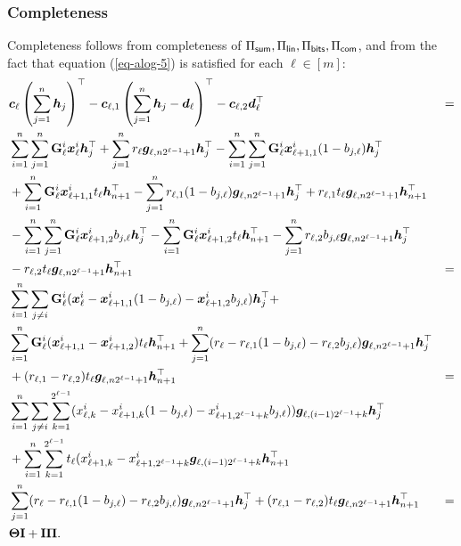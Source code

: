 \subsubsection{Completeness}
Completeness follows from completeness of \(\Pi_{\mathsf{sum}},\Pi_\mathsf{lin},\Pi_{\mathsf{bits}},\Pi_{\mathsf{com}}\), and from the fact that equation (\ref{eq-alog-5}) is satisfied for each \(\ell\in [m]\):
\begin{align*}
&{\boldsymbol{c}}_\ell\left(\sum_{j=1}^n {\boldsymbol{h}}_j\right)^\top-
{\boldsymbol{c}}_{\ell,1}\left(\sum_{j=1}^n{\boldsymbol{h}}_j-{\boldsymbol{d}}_\ell\right)^\top-
{\boldsymbol{c}}_{\ell,2}{\boldsymbol{d}}_\ell^\top &= \\
&\sum_{i=1}^n\sum_{j=1}^n\mathbf{{G}}_{\ell}^{i}{\boldsymbol{x}}^i_{\ell}{\boldsymbol{h}}_j^\top+\sum_{j=1}^nr_\ell{\boldsymbol{g}}_{\ell,n2^{\ell-1}+1}{\boldsymbol{h}}_j^\top
-\sum_{i=1}^n\sum_{j=1}^n\mathbf{{G}}_{\ell}^{i}{\boldsymbol{x}}^i_{\ell+1,1}(1-b_{j,\ell}){\boldsymbol{h}}_j^\top\\
&+\sum_{i=1}^n\mathbf{{G}}_{\ell}^{i}{\boldsymbol{x}}^i_{\ell+1,1} t_\ell{\boldsymbol{h}}_{n+1}^\top-\sum_{j=1}^nr_{\ell,1}(1-b_{j,\ell}){\boldsymbol{g}}_{\ell,n2^{\ell-1}+1}{\boldsymbol{h}}_j^\top+ r_{\ell,1}t_\ell{\boldsymbol{g}}_{\ell,n2^{\ell-1}+1}{\boldsymbol{h}}_{n+1}^\top\\
&-\sum_{i=1}^n\sum_{j=1}^n\mathbf{{G}}_{\ell}^{i}{\boldsymbol{x}}^i_{\ell+1,2}b_{j,\ell}{\boldsymbol{h}}_j^\top-\sum_{i=1}^n\mathbf{{G}}_{\ell}^{i}{\boldsymbol{x}}^i_{\ell+1,2} t_\ell{\boldsymbol{h}}_{n+1}^\top-\sum_{j=1}^nr_{\ell,2}b_{j,\ell}{\boldsymbol{g}}_{\ell,n2^{\ell-1}+1}{\boldsymbol{h}}_j^\top\\
&- r_{\ell,2}t_\ell{\boldsymbol{g}}_{\ell,n2^{\ell-1}+1}{\boldsymbol{h}}_{n+1}^\top &=\\
&\sum_{i=1}^n\sum_{j\neq i}\mathbf{{G}}_{\ell}^{i}({\boldsymbol{x}}^i_\ell-{\boldsymbol{x}}^i_{\ell+1,1}(1-b_{j,\ell})-{\boldsymbol{x}}^i_{\ell+1,2}b_{j,\ell}){\boldsymbol{h}}_j^\top+\\
&\sum_{i=1}^n\mathbf{{G}}_{\ell}^{i}({\boldsymbol{x}}^i_{\ell+1,1}-{\boldsymbol{x}}^i_{\ell+1,2})t_\ell{\boldsymbol{h}}_{n+1}^\top+\sum_{j=1}^n(r_\ell-r_{\ell,1}(1-b_{j,\ell})-r_{\ell,2}b_{j,\ell}){\boldsymbol{g}}_{\ell,n2^{\ell-1}+1}{\boldsymbol{h}}_{j}^\top\\
&+(r_{\ell,1}-r_{\ell,2})t_\ell{\boldsymbol{g}}_{\ell,n2^{\ell-1}+1}{\boldsymbol{h}}_{n+1}^\top &=\\
&\sum_{i=1}^n\sum_{j\neq i}\sum_{k=1}^{2^{\ell-1}}(x^i_{\ell,k}-x^i_{\ell+1,k}(1-b_{j,\ell})-x^i_{\ell+1,2^{\ell-1}+k}b_{j,\ell})){\boldsymbol{g}}_{\ell,(i-1)2^{\ell-1}+k}{\boldsymbol{h}}_j^\top\\
&+\sum_{i=1}^n\sum_{k=1}^{2^{\ell-1}}t_\ell(x^i_{\ell+1,k}-x^i_{\ell+1,2^{\ell-1}+k}{\boldsymbol{g}}_{\ell,(i-1)2^{\ell-1}+k}{\boldsymbol{h}}_{n+1}^\top\\
&\sum_{j=1}^n(r_\ell-r_{\ell,1}(1-b_{j,\ell})-r_{\ell,2}b_{j,\ell}){\boldsymbol{g}}_{\ell,n2^{\ell-1}+1}{\boldsymbol{h}}_{j}^\top+(r_{\ell,1}-r_{\ell,2})t_\ell{\boldsymbol{g}}_{\ell,n2^{\ell-1}+1}{\boldsymbol{h}}_{n+1}^\top &=\\
&\mathbf{{\Theta}}\mathbf{{I}}+\mathbf{{I}}\mathbf{{\Pi}}.
\end{align*}

